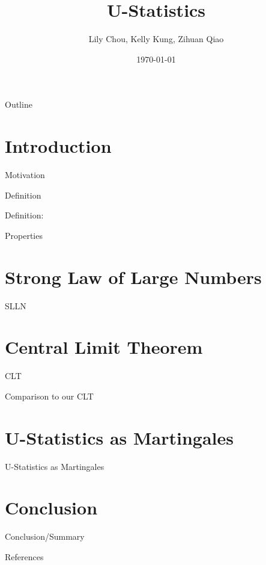 \documentclass{beamer}
\title{U-Statistics}
\author{Lily Chou, Kelly Kung, Zihuan Qiao}
\institute{Probability Theory II}
\date{\today}
\begin{document}
\begin{frame}
  \titlepage
\end{frame}

\begin{frame}{Outline}
  \tableofcontents
\end{frame}

\section{Introduction}
\begin{frame}{Motivation}
\end{frame}
\begin{frame}{Definition}
\begin{block}{Definition:}

\end{block}
\end{frame}
\begin{frame}{Properties}
\end{frame}

\section{Strong Law of Large Numbers}
\begin{frame}{SLLN}
\end{frame}
\section{Central Limit Theorem}
\begin{frame}{CLT}
\end{frame}
\begin{frame}{Comparison to our CLT}
\end{frame}
\section{U-Statistics as Martingales}
\begin{frame}{U-Statistics as Martingales}
\end{frame}
\section{Conclusion}
\begin{frame}{Conclusion/Summary}
\end{frame}
\begin{frame}{References}
\end{frame}
\end{document}

